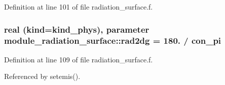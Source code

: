 Definition at line 101 of file radiation\+\_\+surface.\+f.

\subsubsection[{\texorpdfstring{rad2dg}{rad2dg}}]{\setlength{\rightskip}{0pt plus 5cm}real (kind=kind\+\_\+phys), parameter module\+\_\+radiation\+\_\+surface\+::rad2dg = 180. / con\+\_\+pi\hspace{0.3cm}{\ttfamily [private]}}\hypertarget{group__module__radiation__surface_gab879c7cf4e0774089a626e54226e4c1b}{}\label{group__module__radiation__surface_gab879c7cf4e0774089a626e54226e4c1b}


Definition at line 109 of file radiation\+\_\+surface.\+f.



Referenced by setemis().


